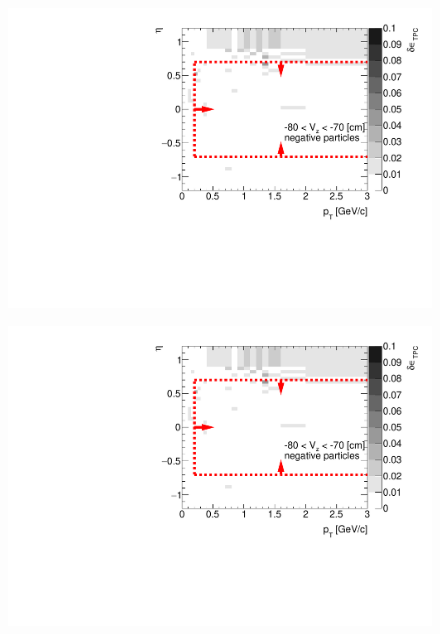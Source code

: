 \begin{figure}[H]
{		\includegraphics[width=\linewidth,page=31]{graphics/systematicsEfficiency/deadMaterial/secondaries_Unbinned_Charged_SDCD.pdf}\\
	}%
\end{figure}

\begin{figure}[H]\ContinuedFloat
	\vspace{-3.5em}
	\parbox{0.325\textwidth}{
		\includegraphics[width=\linewidth,page=32]{graphics/systematicsEfficiency/deadMaterial/secondaries_Unbinned_Charged_SDCD.pdf}\\
	}~
	\vspace{-4em}
\end{figure}